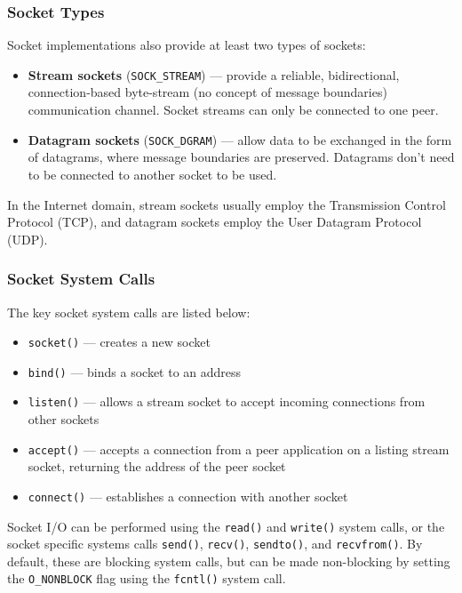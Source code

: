 \documentclass{article}
\begin{document}
\subsubsection{Socket Types}
Socket implementations also provide at least two types of sockets:
\begin{itemize}
    \item \textbf{Stream sockets} (\texttt{SOCK_STREAM}) ---
          provide a reliable, bidirectional, connection-based byte-stream
          (no concept of message boundaries) communication channel.
          Socket streams can only be connected to one peer.
    \item \textbf{Datagram sockets} (\texttt{SOCK_DGRAM}) ---
          allow data to be exchanged in the form of datagrams, where
          message boundaries are preserved. Datagrams don't need to be
          connected to another socket to be used.
\end{itemize}
In the Internet domain, stream sockets usually employ the Transmission
Control Protocol (TCP), and datagram sockets employ the User Datagram
Protocol (UDP).
\subsubsection{Socket System Calls}
The key socket system calls are listed below:
\begin{itemize}
    \item \texttt{socket()} --- creates a new socket
    \item \texttt{bind()} --- binds a socket to an address
    \item \texttt{listen()} --- allows a stream socket to accept
          incoming connections from other sockets
    \item \texttt{accept()} --- accepts a connection from a peer
          application on a listing stream socket, returning the address of the
          peer socket
    \item \texttt{connect()} --- establishes a connection with
          another socket
\end{itemize}
Socket I/O can be performed using the \texttt{read()} and
\texttt{write()} system calls, or the socket specific systems
calls \texttt{send()}, \texttt{recv()},
\texttt{sendto()}, and \texttt{recvfrom()}. By default,
these are blocking system calls, but can be made non-blocking by
setting the \texttt{O_NONBLOCK} flag using the \texttt{fcntl()}
system call.
\end{document}
